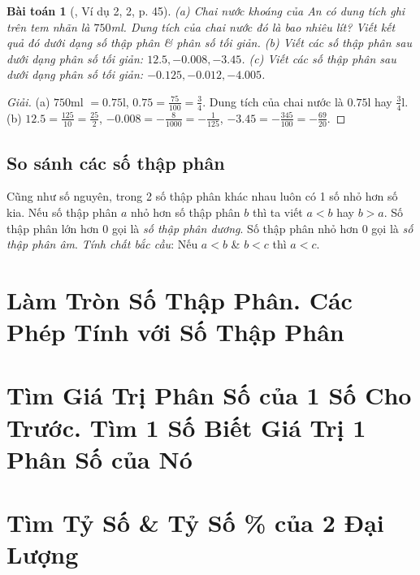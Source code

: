 \documentclass{article}
\newtheorem{baitoan}{Bài toán}
\begin{document}
\begin{baitoan}[\cite{SGK_Toan_6_Canh_Dieu_tap_2}, Ví dụ 2, 2, p. 45]
	(a) Chai nước khoáng của An có dung tích ghi trên tem nhãn là $750$\emph{ml}. Dung tích của chai nước đó là bao nhiêu lít? Viết kết quả đó dưới dạng số thập phân \& phân số tối giản. (b) Viết các số thập phân sau dưới dạng phân số tối giản: $12.5,-0.008,-3.45$. (c) Viết các số thập phân sau dưới dạng phân số tối giản: $-0.125,-0.012,-4.005$.
\end{baitoan}

\begin{proof}[Giải]
	(a) $750$ml $= 0.75$l, $0.75 = \frac{75}{100} = \frac{3}{4}$. Dung tích của chai nước là $0.75$l hay $\frac{3}{4}$l. (b) $12.5 = \frac{125}{10} = \frac{25}{2}$, $-0.008 = -\frac{8}{1000} = -\frac{1}{125}$, $-3.45 = -\frac{345}{100} = -\frac{69}{20}$.
\end{proof}

\subsection{So sánh các số thập phân}
Cũng như số nguyên, trong 2 số thập phân khác nhau luôn có 1 số nhỏ hơn số kia. Nếu số thập phân $a$ nhỏ hơn số thập phân $b$ thì ta viết $a < b$ hay $b > a$. Số thập phân lớn hơn $0$ gọi là \textit{số thập phân dương}. Số thập phân nhỏ hơn $0$ gọi là \textit{số thập phân âm}. \textit{Tính chất bắc cầu}: Nếu $a < b$ \& $b < c$ thì $a < c$.




\section{Làm Tròn Số Thập Phân. Các Phép Tính với Số Thập Phân}


\section{Tìm Giá Trị Phân Số của 1 Số Cho Trước. Tìm 1 Số Biết Giá Trị 1 Phân Số của Nó}


\section{Tìm Tỷ Số \& Tỷ Số \% của 2 Đại Lượng}
\end{document}
